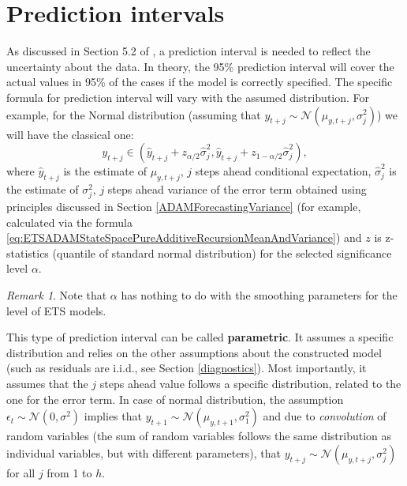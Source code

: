 \documentclass[
]{book}
\theoremstyle{definition}
\theoremstyle{definition}
\theoremstyle{definition}
\theoremstyle{definition}
\theoremstyle{remark}
\newtheorem*{remark}{Remark}
\begin{document}
\hypertarget{ADAMForecastingPI}{%
\section{Prediction intervals}\label{ADAMForecastingPI}}

As discussed in Section 5.2 of \citet{SvetunkovSBA}, a prediction interval is needed to reflect the uncertainty about the data. In theory, the 95\% prediction interval will cover the actual values in 95\% of the cases if the model is correctly specified. The specific formula for prediction interval will vary with the assumed distribution. For example, for the Normal distribution (assuming that \(y_{t+j} \sim \mathcal{N}(\mu_{y, t+j}, \sigma_j^2)\)) we will have the classical one:
\begin{equation}
    y_{t+j} \in (\hat{y}_{t+j} + z_{\alpha/2} \hat{\sigma}_j^2, \hat{y}_{t+j} + z_{1-\alpha/2} \hat{\sigma}_j^2),
    \label{eq:predictionInterval}
\end{equation}
where \(\hat{y}_{t+j}\) is the estimate of \(\mu_{y,t+j}\), \(j\) steps ahead conditional expectation, \(\hat{\sigma}_j^2\) is the estimate of \({\sigma}_j^2\), \(j\) steps ahead variance of the error term obtained using principles discussed in Section \ref{ADAMForecastingVariance} (for example, calculated via the formula \eqref{eq:ETSADAMStateSpacePureAdditiveRecursionMeanAndVariance}) and \(z\) is z-statistics (quantile of standard normal distribution) for the selected significance level \(\alpha\).

\begin{remark}
Note that \(\alpha\) has nothing to do with the smoothing parameters for the level of ETS models.
\end{remark}

This type of prediction interval can be called \textbf{parametric}. It assumes a specific distribution and relies on the other assumptions about the constructed model (such as residuals are i.i.d., see Section \ref{diagnostics}). Most importantly, it assumes that the \(j\) steps ahead value follows a specific distribution, related to the one for the error term. In case of normal distribution, the assumption \(\epsilon_t\sim\mathcal{N}(0,\sigma^2)\) implies that \(y_{t+1}\sim\mathcal{N}(\mu_{y,t+1}, \sigma_1^2)\) and due to \emph{convolution} of random variables (the sum of random variables follows the same distribution as individual variables, but with different parameters), that \(y_{t+j}\sim\mathcal{N}(\mu_{y,t+j},\sigma_j^2)\) for all \(j\) from 1 to \(h\).
\end{document}
